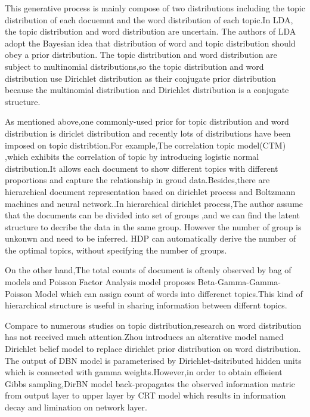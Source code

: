 This generative process is mainly compose of two distributions including the topic distribution of each docuemnt and the word distribution of each topic.In LDA, the topic distribution and word distribution are uncertain. The authors of LDA adopt the Bayesian idea that distribution of word and topic distribution should obey a prior distribution. The topic distribution and word distribution are subject to  multinomial distributions,so the topic distribution and word distribution use Dirichlet distribution as their conjugate prior distribution because the multinomial distribution and Dirichlet distribution is a conjugate structure.

As mentioned above,one commonly-used prior for topic distribution and word distribution is diriclet distribution and recently lots of distributions have been imposed on topic distribtion.For example,The correlation topic model(CTM) \cite{corr} ,which exhibits the correlation of topic by introducing logistic normal distribution.It allows each document to show different topics with different proportions and capture the relationship in groud data.Besides,there are hierarchical document representation based on dirichlet process and Boltzmann machines and neural network.\cite{zhao}.In hierarchical dirichlet process\cite{hdp},The author assume that the documents can be divided into set of groups ,and we can find the latent structure to  decribe the data in the same group. However the number of group is unkonwn and need to be inferred. HDP  can automatically derive the number of the optimal topics, without specifying the number of groups.

On the other hand,The total counts of document is oftenly observed by bag of models and Poisson Factor Analysis model\cite{han} proposes Beta-Gamma-Gamma-Poisson Model which can assign count of words into differenct topics.This kind of hierarchical structure is useful in sharing information between differnt topics.

Compare to numerous studies on topic distribution,research on word distribution has not received much attention.Zhou \cite{dirbn} introduces an alterative model named Dirichlet belief model to replace dirichlet prior distribution on word distribution. The output of DBN model is parameterised by Dirichlet-dsitributed hidden units which is connected with gamma weights.However,in order to obtain effieient Gibbs sampling,DirBN model back-propagates the observed information matric from output layer to upper layer by CRT\cite{crt} model which results in information decay and limination on network layer.

